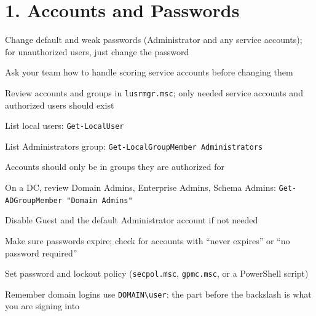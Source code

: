 \documentclass[11pt]{article}
\newcommand{\cmd}[1]{\texttt{\small #1}}
\begin{document}
\section*{1. Accounts and Passwords}
\begin{mycheck}
  \item Change default and weak passwords (Administrator and any service accounts); for unauthorized users, just change the password
  \item Ask your team how to handle scoring service accounts before changing them
  \item Review accounts and groups in \cmd{lusrmgr.msc}; only needed service accounts and authorized users should exist
  \item List local users: \cmd{Get-LocalUser}
  \item List Administrators group: \cmd{Get-LocalGroupMember Administrators}
  \item Accounts should only be in groups they are authorized for
  \item On a DC, review Domain Admins, Enterprise Admins, Schema Admins: \cmd{Get-ADGroupMember "Domain Admins"}
  \item Disable Guest and the default Administrator account if not needed
  \item Make sure passwords expire; check for accounts with ``never expires'' or ``no password required''
  \item Set password and lockout policy (\cmd{secpol.msc}, \cmd{gpmc.msc}, or a PowerShell script)
  \item Remember domain logins use \cmd{DOMAIN\textbackslash user}: the part before the backslash is what you are signing into
\end{mycheck}
\end{document}
